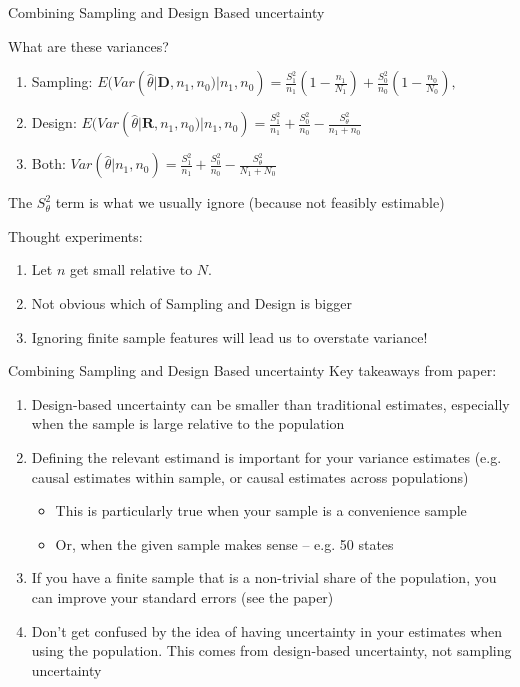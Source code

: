 \documentclass[notes,11pt, aspectratio=169]{beamer}
\newenvironment{wideitemize}{\itemize\addtolength{\itemsep}{10pt}}{\enditemize}
\begin{document}
\begin{frame}{Combining Sampling and Design Based uncertainty}
  \begin{wideitemize}
  \item  What are these variances?
  \begin{enumerate}
  \item Sampling: $E(Var(\hat{\theta} | \mathbf{D}, n_{1}, n_{0}) | n_{1}, n_{0}) = \frac{S^{2}_{1}}{n_{1}}\left(1- \frac{n_{1}}{N_{1}}\right) + \frac{S^{2}_{0}}{n_{0}}\left(1- \frac{n_{0}}{N_{0}}\right),$
  \item Design:  $E(Var(\hat{\theta} | \mathbf{R}, n_{1}, n_{0}) | n_{1}, n_{0}) = \frac{S^{2}_{1}}{n_{1}} + \frac{S^{2}_{0}}{n_{0}} - \frac{S^{2}_{\theta}}{n_{1}+n_{0}}    $
  \item Both: $Var(\hat{\theta} | n_{1}, n_{0}) = \frac{S^{2}_{1}}{n_{1}} + \frac{S^{2}_{0}}{n_{0}} - \frac{S^{2}_{\theta}}{N_{1}+N_{0}}    $
  \end{enumerate}
  The $S^{2}_{\theta}$ term is what we usually ignore (because not feasibly estimable) 
\item Thought experiments:
  \begin{enumerate}
  \item Let $n$ get small relative to $N$.
  \item Not obvious which of Sampling and Design is bigger
  \item Ignoring finite sample features will lead us to overstate variance! 
  \end{enumerate}
  \end{wideitemize}
\end{frame}


\begin{frame}{Combining Sampling and Design Based uncertainty}
  Key takeaways from paper:
  \begin{enumerate}
  \item Design-based uncertainty can be smaller than traditional estimates, especially when the sample is large relative to the population
  \item Defining the relevant estimand is important for your variance estimates (e.g. causal estimates within sample, or causal estimates across populations)
    \begin{itemize}
    \item This is particularly true when your sample is a convenience sample
    \item Or, when the given sample makes sense -- e.g. 50 states
    \end{itemize}
  \item If you have a finite sample that is a non-trivial share of the population, you can improve your standard errors (see the paper)
  \item Don't get confused by the idea of having uncertainty in your
    estimates when using the population. This comes from design-based
    uncertainty, not sampling uncertainty
  \end{enumerate}
\end{frame}
\end{document}
